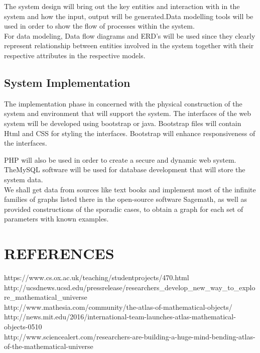 \documentclass[11pt]{article} %
\begin{document}
The system design will bring out the key entities and interaction with in the system and how the input, output will be generated.Data modelling tools will be used in order to show the flow of processes within the system.\\ For data modeling, Data flow diagrams and ERD's will be used since they clearly represent relationship between entities involved in the system together with their respective attributes in the respective models. 
\subsection{System Implementation}
The implementation phase in concerned with the physical construction of the system and environment that will support the system.
The interfaces of the web system will be developed using bootstrap or java. Bootstrap files will contain Html and CSS for styling the interfaces. Bootstrap will enhance responsiveness of the interfaces. 

PHP will also be used in order to create a secure and dynamic web system. \\TheMySQL software will be used for database development that will store the system data.\\ 
We shall get data from sources like text books and implement most of the infinite families of graphs listed there in the open-source software Sagemath, as well as provided constructions of the sporadic cases, to obtain a graph for each set of parameters with known examples.
\section{REFERENCES}

https://www.cs.ox.ac.uk/teaching/studentprojects/470.html  \\
http://ucsdnews.ucsd.edu/pressrelease/researchers_develop_new_way_to_explore_mathematical_universe \\
http://www.mathesia.com/community/the-atlas-of-mathematical-objects/ \\
http://news.mit.edu/2016/international-team-launches-atlas-mathematical-objects-0510 \\
http://www.sciencealert.com/researchers-are-building-a-huge-mind-bending-atlas-of-the-mathematical-universe \\
\end{document}
